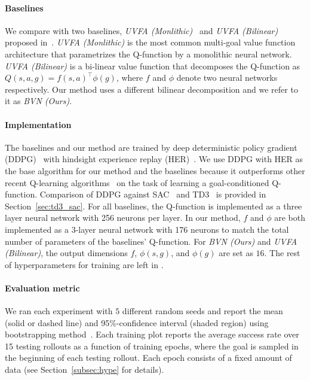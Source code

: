 \documentclass[dvipsnames]{article} %
\theoremstyle{definition}
\theoremstyle{remark}
\newcommand{\mono}{\textit{UVFA (Monlithic)}\xspace}
\newcommand{\bilow}{\textit{UVFA (Bilinear)}\xspace}
\newcommand{\bifull}{\textit{BVN (Ours)}\xspace}
\begin{document}
\paragraph{Baselines} We compare with two baselines, \mono ~\citep{Andrychowicz2017her,Schaul2015UVFA} and \bilow proposed in~\cite{Schaul2015UVFA}. \mono is the most common multi-goal value function architecture that parametrizes the Q-function by a monolithic neural network.
\bilow is a bi-linear value function that decomposes the Q-function as $Q(s,a,g) = f(s,a)^\top \phi(g)$, where $f$ and $\phi$ denote two neural networks respectively. Our method uses a different bilinear decomposition and we refer to it as \bifull. 

\paragraph{Implementation} The baselines and our method are trained by deep deterministic policy gradient (DDPG)~\citep{Lillicrap2015ddpg} with hindsight experience replay (HER)~\citep{Andrychowicz2017her}. We use DDPG with HER as the base algorithm for our method and the baselines because it outperforms other recent Q-learning algorithms~\citep{haarnoja2018soft,Fujimoto2018td3} on the task of learning a goal-conditioned Q-function. Comparison of DDPG against SAC~\citep{haarnoja2018soft} and TD3~\citep{Fujimoto2018td3} is provided in Section~\ref{sec:td3_sac}.  For all baselines, the Q-function is implemented as a three layer neural network with 256 neurons per layer. In our method, $f$ and $\phi$ are both implemented as a 3-layer neural network with 176 neurons to match the total number of parameters of the baselines' Q-function. 
For \bifull and \bilow, the output dimensions $f$, $\phi(s,g)$, and $\phi(g)$ are set as $16$. The rest of hyperparameters for training are left in . 

\paragraph{Evaluation metric} We ran each experiment with $5$ different random seeds and report the mean (solid or dashed line) and 95\%-confidence interval (shaded region) using bootstrapping method~\citep{diciccio1996bootstrap}. Each training plot reports the average success rate over 15 testing rollouts as a function of training epochs, where the goal is sampled in the beginning of each testing rollout. Each epoch consists of a fixed amount of data  (see Section~\ref{subsec:hype} for details). 
\end{document}
